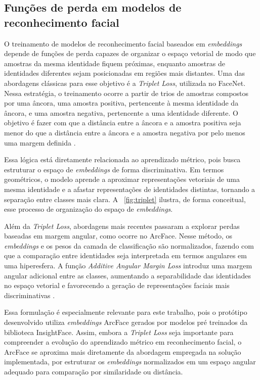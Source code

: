 \subsection{Funções de perda em modelos de reconhecimento facial}

O treinamento de modelos de reconhecimento facial baseados em \textit{embeddings} depende de funções de perda capazes de organizar o espaço vetorial de modo que amostras da mesma identidade fiquem próximas, enquanto amostras de identidades diferentes sejam posicionadas em regiões mais distantes. Uma das abordagens clássicas para esse objetivo é a \textit{Triplet Loss}, utilizada no FaceNet. Nessa estratégia, o treinamento ocorre a partir de trios de amostras compostos por uma âncora, uma amostra positiva, pertencente à mesma identidade da âncora, e uma amostra negativa, pertencente a uma identidade diferente. O objetivo é fazer com que a distância entre a âncora e a amostra positiva seja menor do que a distância entre a âncora e a amostra negativa por pelo menos uma margem definida \cite{schroff2015facenet}.

Essa lógica está diretamente relacionada ao aprendizado métrico, pois busca estruturar o espaço de \textit{embeddings} de forma discriminativa. Em termos geométricos, o modelo aprende a aproximar representações vetoriais de uma mesma identidade e a afastar representações de identidades distintas, tornando a separação entre classes mais clara. A ~\ref{fig:triplet} ilustra, de forma conceitual, esse processo de organização do espaço de \textit{embeddings}.

Além da \textit{Triplet Loss}, abordagens mais recentes passaram a explorar perdas baseadas em margem angular, como ocorre no ArcFace. Nesse método, os \textit{embeddings} e os pesos da camada de classificação são normalizados, fazendo com que a comparação entre identidades seja interpretada em termos angulares em uma hiperesfera. A função \textit{Additive Angular Margin Loss} introduz uma margem angular adicional entre as classes, aumentando a separabilidade das identidades no espaço vetorial e favorecendo a geração de representações faciais mais discriminativas \cite{deng2019arcface}.

Essa formulação é especialmente relevante para este trabalho, pois o protótipo desenvolvido utiliza \textit{embeddings} ArcFace gerados por modelos pré treinados da biblioteca InsightFace. Assim, embora a \textit{Triplet Loss} seja importante para compreender a evolução do aprendizado métrico em reconhecimento facial, o ArcFace se aproxima mais diretamente da abordagem empregada na solução implementada, por estruturar os \textit{embeddings} normalizados em um espaço angular adequado para comparação por similaridade ou distância.


